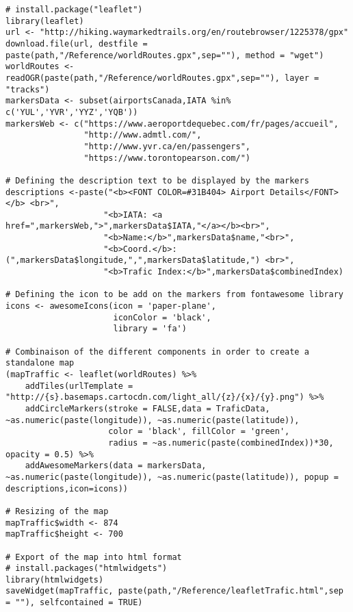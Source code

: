 
\begin{lstlisting}[caption = Générer une carte du trafic aérien avec \emph{leaflet},label=src:leaflet]
# install.package("leaflet")
library(leaflet)
url <- "http://hiking.waymarkedtrails.org/en/routebrowser/1225378/gpx"
download.file(url, destfile = paste(path,"/Reference/worldRoutes.gpx",sep=""), method = "wget")
worldRoutes <- readOGR(paste(path,"/Reference/worldRoutes.gpx",sep=""), layer = "tracks")
markersData <- subset(airportsCanada,IATA %in% c('YUL','YVR','YYZ','YQB'))
markersWeb <- c("https://www.aeroportdequebec.com/fr/pages/accueil",
                "http://www.admtl.com/",
                "http://www.yvr.ca/en/passengers",
                "https://www.torontopearson.com/")

# Defining the description text to be displayed by the markers
descriptions <-paste("<b><FONT COLOR=#31B404> Airport Details</FONT></b> <br>",
                    "<b>IATA: <a href=",markersWeb,">",markersData$IATA,"</a></b><br>",
                    "<b>Name:</b>",markersData$name,"<br>",
                    "<b>Coord.</b>: (",markersData$longitude,",",markersData$latitude,") <br>",
                    "<b>Trafic Index:</b>",markersData$combinedIndex)

# Defining the icon to be add on the markers from fontawesome library
icons <- awesomeIcons(icon = 'paper-plane',
                      iconColor = 'black',
                      library = 'fa')

# Combinaison of the different components in order to create a standalone map
(mapTraffic <- leaflet(worldRoutes) %>%
    addTiles(urlTemplate = "http://{s}.basemaps.cartocdn.com/light_all/{z}/{x}/{y}.png") %>%
    addCircleMarkers(stroke = FALSE,data = TraficData, ~as.numeric(paste(longitude)), ~as.numeric(paste(latitude)),
                     color = 'black', fillColor = 'green',
                     radius = ~as.numeric(paste(combinedIndex))*30, opacity = 0.5) %>%
    addAwesomeMarkers(data = markersData, ~as.numeric(paste(longitude)), ~as.numeric(paste(latitude)), popup = descriptions,icon=icons))

# Resizing of the map
mapTraffic$width <- 874
mapTraffic$height <- 700

# Export of the map into html format
# install.packages("htmlwidgets")
library(htmlwidgets)
saveWidget(mapTraffic, paste(path,"/Reference/leafletTrafic.html",sep = ""), selfcontained = TRUE)
\end{lstlisting}

